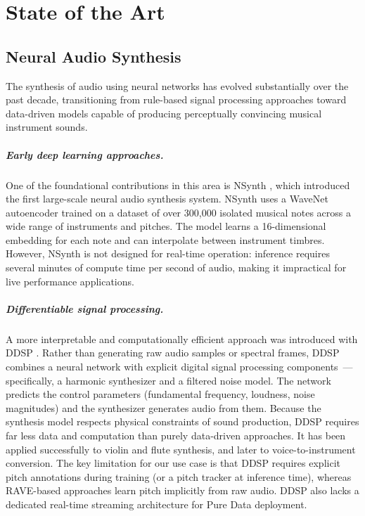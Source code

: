 \chapter{State of the Art}
\label{ch:sota}

\section{Neural Audio Synthesis}
\label{sec:sota_neural_audio}

The synthesis of audio using neural networks has evolved substantially over the past decade, transitioning from rule-based signal processing approaches toward data-driven models capable of producing perceptually convincing musical instrument sounds.

\paragraph{Early deep learning approaches.}
One of the foundational contributions in this area is NSynth \cite{engel2017nsynth}, which introduced the first large-scale neural audio synthesis system. NSynth uses a WaveNet autoencoder trained on a dataset of over 300{,}000 isolated musical notes across a wide range of instruments and pitches. The model learns a 16-dimensional embedding for each note and can interpolate between instrument timbres. However, NSynth is not designed for real-time operation: inference requires several minutes of compute time per second of audio, making it impractical for live performance applications.

\paragraph{Differentiable signal processing.}
A more interpretable and computationally efficient approach was introduced with DDSP \cite{engel2020ddsp}. Rather than generating raw audio samples or spectral frames, DDSP combines a neural network with explicit digital signal processing components~--- specifically, a harmonic synthesizer and a filtered noise model. The network predicts the control parameters (fundamental frequency, loudness, noise magnitudes) and the synthesizer generates audio from them. Because the synthesis model respects physical constraints of sound production, DDSP requires far less data and computation than purely data-driven approaches. It has been applied successfully to violin and flute synthesis, and later to voice-to-instrument conversion. The key limitation for our use case is that DDSP requires explicit pitch annotations during training (or a pitch tracker at inference time), whereas RAVE-based approaches learn pitch implicitly from raw audio. DDSP also lacks a dedicated real-time streaming architecture for Pure Data deployment.

